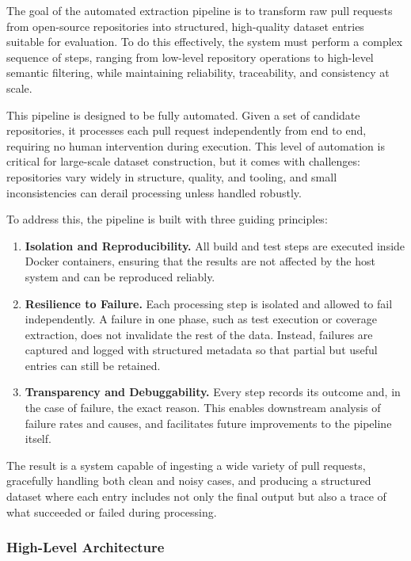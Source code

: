 The goal of the automated extraction pipeline is to transform raw pull requests from open-source
repositories into structured, high-quality dataset entries suitable for evaluation. To do this
effectively, the system must perform a complex sequence of steps, ranging from low-level repository
operations to high-level semantic filtering, while maintaining reliability, traceability, and
consistency at scale.

This pipeline is designed to be fully automated. Given a set of candidate repositories, it processes
each pull request independently from end to end, requiring no human intervention during execution.
This level of automation is critical for large-scale dataset construction, but it comes with
challenges: repositories vary widely in structure, quality, and tooling, and small inconsistencies
can derail processing unless handled robustly.

To address this, the pipeline is built with three guiding principles:
\begin{enumerate}
	\item \textbf{Isolation and Reproducibility.} All build and test steps are executed inside
	      Docker containers, ensuring that the results are not affected by the host system and can
	      be reproduced reliably.

	\item \textbf{Resilience to Failure.} Each processing step is isolated and allowed to fail
	      independently. A failure in one phase, such as test execution or coverage extraction, does
	      not invalidate the rest of the data. Instead, failures are captured and logged with
	      structured metadata so that partial but useful entries can still be retained.

	\item \textbf{Transparency and Debuggability.} Every step records its outcome and, in the case
	      of failure, the exact reason. This enables downstream analysis of failure rates and causes,
	      and facilitates future improvements to the pipeline itself.
\end{enumerate}

The result is a system capable of ingesting a wide variety of pull requests, gracefully handling
both clean and noisy cases, and producing a structured dataset where each entry includes not only
the final output but also a trace of what succeeded or failed during processing.

\subsubsection{High-Level Architecture}

